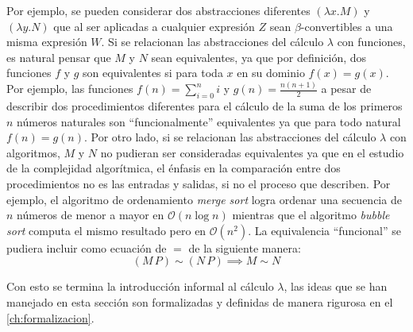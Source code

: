 Por ejemplo, se pueden considerar dos abstracciones diferentes $ (λx.M) $ y $ (λy.N) $ que al ser aplicadas a cualquier expresión $ Z $ sean $ β $-convertibles a una misma expresión $ W $. Si se relacionan las abstracciones del cálculo $ λ $ con funciones, es natural pensar que $ M $ y $ N $ sean equivalentes, ya que por definición, dos funciones $ f $ y $ g $ son equivalentes si para toda $ x $ en su dominio $ f(x)=g(x) $. Por ejemplo, las funciones $ f(n)=\sum_{i=0}^{n}i $ y $ g(n)=\frac{n(n+1)}{2} $ a pesar de describir dos procedimientos diferentes para el cálculo de la suma de los primeros $ n $ números naturales son ``funcionalmente'' equivalentes ya que para todo natural $ f(n)=g(n) $. Por otro lado, si se relacionan las abstracciones del cálculo $ λ $ con algoritmos, $ M $ y $ N $ no pudieran ser consideradas equivalentes ya que en el estudio de la complejidad algorítmica, el énfasis en la comparación entre dos procedimientos no es las entradas y salidas, si no el proceso que describen. Por ejemplo, el algoritmo de ordenamiento \emph{merge sort} logra ordenar una secuencia de $ n $ números de menor a mayor en $ \mathcal{O}(n \log n) $ mientras que el algoritmo \emph{bubble sort} computa el mismo resultado pero en $ \mathcal{O}(n^2) $.  La equivalencia ``funcional'' se pudiera incluir como ecuación de $ = $ de la siguiente manera:
\[ (M\, P) \sim (N\, P) \implies M \sim N \]

Con esto se termina la introducción informal al cálculo $ λ $, las ideas que se han manejado en esta sección son formalizadas y definidas de manera rigurosa en el \autoref{ch:formalizacion}.

